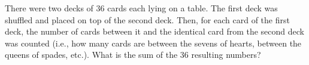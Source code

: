 There were two decks of 36 cards each lying on a table. The first deck was shuffled and placed on top of the second deck. Then, for each card of the first deck, the number of cards between it and the identical card from the second deck was counted (i.e., how many cards are between the sevens of hearts, between the queens of spades, etc.). What is the sum of the 36 resulting numbers?
